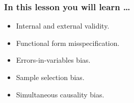 

\begin{frame}
\frametitle{In this lesson you will learn \dots}
\begin{itemize}
\item Internal and external validity.
\item Functional form misspecification.
\item Errors-in-variables bias. 
\item Sample selection bias. 
\item Simultaneous causality bias.
\end{itemize}
\end{frame}

